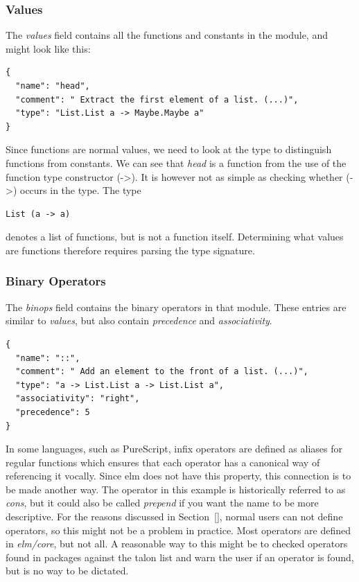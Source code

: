 \documentclass[../thesis.tex]{subfiles}
\begin{document}
\subsubsection{Values}\label{values}
The \textit{values} field contains all the functions and constants in the module, and might look like this:
\begin{verbatim}
{
  "name": "head",
  "comment": " Extract the first element of a list. (...)",
  "type": "List.List a -> Maybe.Maybe a"
}
\end{verbatim}
Since functions are normal values, we need to look at the type to distinguish functions from constants.
We can see that \textit{head} is a function from the use of the function type constructor (->).
It is however not as simple as checking whether (->) occurs in the type.
The type
\begin{verbatim}
List (a -> a)
\end{verbatim}
denotes a list of functions, but is not a function itself.
Determining what values are functions therefore requires parsing the type signature.

\subsubsection{Binary Operators}\label{binary_operators}
The \textit{binops} field contains the binary operators in that module.
These entries are similar to \textit{values}, but also contain \textit{precedence} and \textit{associativity}.
\begin{verbatim}
{
  "name": "::",
  "comment": " Add an element to the front of a list. (...)",
  "type": "a -> List.List a -> List.List a",
  "associativity": "right",
  "precedence": 5
}
\end{verbatim}
In some languages, such as PureScript, infix operators are defined as aliases
for regular functions which ensures that each operator has a canonical way of referencing it vocally.
Since elm does not have this property, this connection is to be made another way.
The operator in this example is historically referred to as \textit{cons}, but it could also be called
\textit{prepend} if you want the name to be more descriptive.
For the reasons discussed in Section~\ref{}, normal users can not define operators, so this might not be a problem in practice.
Most operators are defined in \textit{elm/core}, but not all.%
A reasonable way to this might be to checked operators found in packages against the talon list
and warn the user if an operator is found, but is no way to be dictated.
\end{document}
